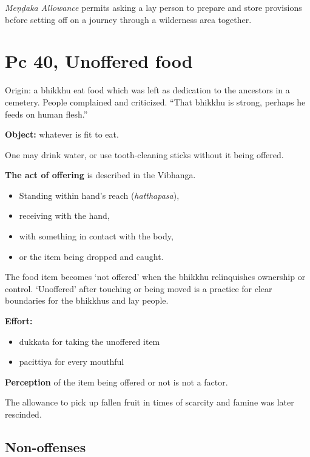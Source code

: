 \emph{Meṇḍaka Allowance} permits asking a lay person to prepare and
store provisions before setting off on a journey through a wilderness
area together.

\section{Pc 40, Unoffered food}

Origin: a bhikkhu eat food which was left as dedication to the ancestors
in a cemetery. People complained and criticized. ``That bhikkhu is
strong, perhaps he feeds on human flesh.''

\textbf{Object:} whatever is fit to eat.

One may drink water, or use tooth-cleaning sticks without it being
offered.

\textbf{The act of offering} is described in the Vibhanga.

\begin{itemize}
\tightlist
\item
  Standing within hand's reach (\emph{hatthapasa}),
\item
  receiving with the hand,
\item
  with something in contact with the body,
\item
  or the item being dropped and caught.
\end{itemize}

The food item becomes `not offered' when the bhikkhu relinquishes
ownership or control. `Unoffered' after touching or being moved is a
practice for clear boundaries for the bhikkhus and lay people.

\textbf{Effort:}

\begin{itemize}
\tightlist
\item
  dukkata for taking the unoffered item
\item
  pacittiya for every mouthful
\end{itemize}

\clearpage

\textbf{Perception} of the item being offered or not is not a factor.

The allowance to pick up fallen fruit in times of scarcity and famine
was later rescinded.

\subsection{Non-offenses}


